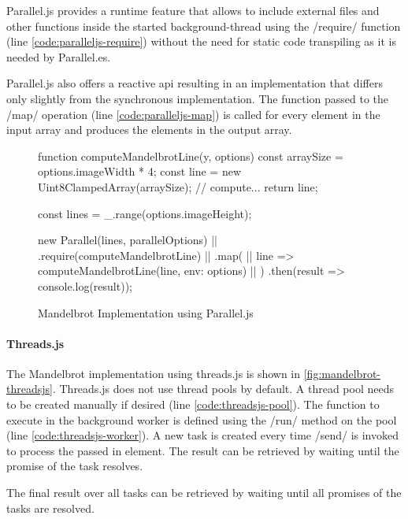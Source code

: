 Parallel.js provides a runtime feature that allows to include external files and other functions inside the started background-thread using the \javascriptinline/require/ function (line \ref{code:paralleljs-require}) without the need for static code transpiling as it is needed by Parallel.es. 

Parallel.js also offers a reactive api resulting in an implementation that differs only slightly from the synchronous implementation. The function passed to the \javascriptinline/map/ operation (line \ref{code:paralleljs-map}) is called for every element in the input array and produces the elements in the output array.

\begin{figure}
	\begin{javascriptcode}
function computeMandelbrotLine(y, options) {
	const arraySize = options.imageWidth * 4;
	const line = new Uint8ClampedArray(arraySize);
	// compute...
	return line;
}

const lines = _.range(options.imageHeight);

new Parallel(lines, parallelOptions) |$\label{code:paralleljs-definition}$|
	.require(computeMandelbrotLine)  |$\label{code:paralleljs-require}$|
	.map( |$\label{code:paralleljs-map}$|
		line => computeMandelbrotLine(line, {env: options}) |$\label{code:paralleljs-global}$|
	)
	.then(result => console.log(result));
\end{javascriptcode}

\caption{Mandelbrot Implementation using Parallel.js}
\label{fig:mandelbrot-paralleljs}
\end{figure}

\paragraph{Threads.js}
 The Mandelbrot implementation using threads.js is shown in \cref{fig:mandelbrot-threadsjs}. Threads.js does not use thread pools by default. A thread pool needs to be created manually if desired (line \ref{code:threadsjs-pool}). The function to execute in the background worker is defined using the \javascriptinline/run/ method on the pool (line \ref{code:threadsjs-worker}). A new task is created every time \javascriptinline/send/ is invoked to process the passed in element. The result can be retrieved by waiting until the promise of the task resolves. 
 
The final result over all tasks can be retrieved by waiting until all promises of the tasks are resolved.


